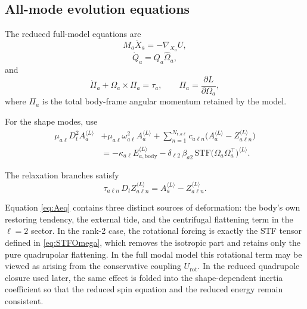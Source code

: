 \documentclass[journal, a4paper]{IEEEtran}
\begin{document}
\subsection{All-mode evolution equations}

The reduced full-model equations are
\begin{equation}
M_a \ddot X_a = -\nabla_{X_a}U,
\label{eq:Xfull}
\end{equation}
\begin{equation}
\dot Q_a = Q_a \widehat{\Omega}_a,
\label{eq:Qfull}
\end{equation}
and
\begin{equation}
\dot \Pi_a + \Omega_a \times \Pi_a = \tau_a,
\qquad
\Pi_a = \frac{\partial L}{\partial \Omega_a},
\label{eq:spinfull}
\end{equation}
where $\Pi_a$ is the total body-frame angular momentum retained by the model.

For the shape modes, use
\begin{align}
\mu_{a\ell} D_t^2 A_a^{\langle L\rangle}
&+
\mu_{a\ell}\omega_{a\ell}^2 A_a^{\langle L\rangle}
+
\sum_{n=1}^{N_{\mathrm{r},a\ell}}
c_{a\ell n}
\bigl(
A_a^{\langle L\rangle}
-
Z_{a\ell n}^{\langle L\rangle}
\bigr)
\nonumber\\
&=
-\kappa_{a\ell}
E_{a,\mathrm{body}}^{\langle L\rangle}
-
\delta_{\ell 2}\,
\beta_{a2}\,
\mathrm{STF}
\bigl(
\Omega_a\Omega_a^\top
\bigr)^{\langle L\rangle}.
\label{eq:Aeq}
\end{align}

The relaxation branches satisfy
\begin{equation}
\tau_{a\ell n}\,
D_t Z_{a\ell n}^{\langle L\rangle}
=
A_a^{\langle L\rangle}
-
Z_{a\ell n}^{\langle L\rangle}.
\label{eq:Zeq}
\end{equation}

Equation \eqref{eq:Aeq} contains three distinct sources of deformation:
the body's own restoring tendency, the external tide, and the centrifugal
flattening term in the $\ell=2$ sector. In the rank-2 case, the rotational
forcing is exactly the STF tensor defined in \eqref{eq:STFOmega}, which
removes the isotropic part and retains only the pure quadrupolar flattening.
In the full modal model this rotational term may be viewed as arising from the
conservative coupling $U_{\mathrm{rot}}$. In the reduced quadrupole closure used
later, the same effect is folded into the shape-dependent inertia coefficient
so that the reduced spin equation and the reduced energy remain consistent.
\end{document}

